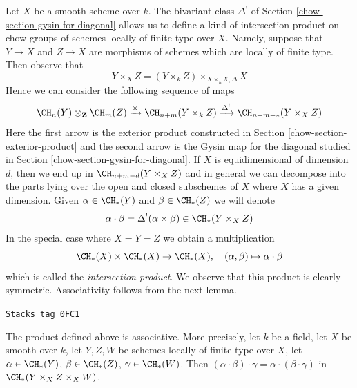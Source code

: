 \medskip\noindent
Let $X$ be a smooth scheme over $k$. The bivariant class $\Delta^!$
of Section \ref{chow-section-gysin-for-diagonal} allows us to define a kind of
intersection product on chow groups of schemes locally of finite type over $X$.
Namely, suppose that $Y \to X$ and $Z \to X$ are morphisms of schemes
which are locally of finite type. Then observe that
$$
Y \times_X Z =  (Y \times_k Z) \times_{X \times_k X, \Delta} X
$$
Hence we can consider the following sequence of maps
$$
\CH_n(Y) \otimes_\mathbf{Z} \CH_m(Z)
\xrightarrow{\times}
\CH_{n + m}(Y \times_k Z)
\xrightarrow{\Delta^!}
\CH_{n + m - *}(Y \times_X Z)
$$
Here the first arrow is the exterior product constructed in
Section \ref{chow-section-exterior-product} and the second arrow
is the Gysin map for the diagonal studied in
Section \ref{chow-section-gysin-for-diagonal}. If $X$ is equidimensional
of dimension $d$, then we end up in $\CH_{n + m - d}(Y \times_X Z)$
and in general we can decompose into the parts lying over the open
and closed subschemes of $X$ where $X$ has a given dimension.
Given $\alpha \in \CH_*(Y)$ and $\beta \in \CH_*(Z)$ we will denote
$$
\alpha \cdot \beta = \Delta^!(\alpha \times \beta)
\in \CH_*(Y \times_X Z)
$$
In the special case where $X = Y = Z$ we obtain a multiplication
$$
\CH_*(X) \times \CH_*(X) \to \CH_*(X),\quad
(\alpha, \beta) \mapsto \alpha \cdot \beta
$$
which is called the {\it intersection product}. We observe that
this product is clearly symmetric. Associativity follows from
the next lemma.

\begin{lemma}[Associative]
\label{chow-lemma-associative}
\href{https://stacks.math.columbia.edu/tag/0FC1}{\texttt{Stacks tag 0FC1}}

The product defined above is associative. More precisely, let $k$ be a field,
let $X$ be smooth over $k$,
let $Y, Z, W$ be schemes locally of finite type over $X$, let
$\alpha \in \CH_*(Y)$, $\beta \in \CH_*(Z)$, $\gamma \in \CH_*(W)$.
Then $(\alpha \cdot \beta) \cdot \gamma =
\alpha \cdot (\beta \cdot \gamma)$ in $\CH_*(Y \times_X Z \times_X W)$.
\end{lemma}

